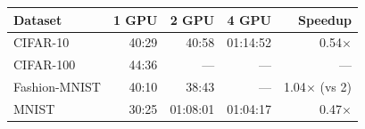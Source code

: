 \begin{tabular}{lrrrr}
\toprule
Dataset & 1 GPU & 2 GPU & 4 GPU & Speedup \\
\midrule
CIFAR-10 & 40:29 & 40:58 & 01:14:52 & 0.54$\times$ \\
CIFAR-100 & 44:36 & — & — & — \\
Fashion-MNIST & 40:10 & 38:43 & — & 1.04$\times$ (vs 2) \\
MNIST & 30:25 & 01:08:01 & 01:04:17 & 0.47$\times$ \\
\bottomrule
\end{tabular}